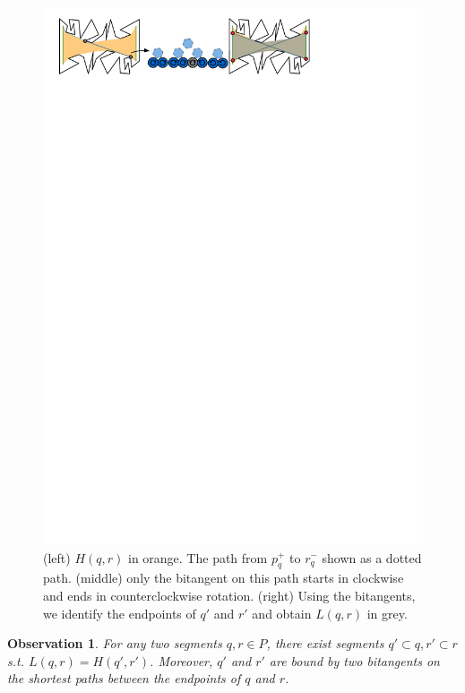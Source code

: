 \documentclass[UKenglish]{lipics-v2019}
\newcommand{\myremark}[4]{\textcolor{blue}{\textsc{#1 #2:}} \textcolor{#4}{\textsf{#3}}}
\newcommand{\ivor}[2][says]{\myremark{Ivor}{#1}{#2}{Blue}}
\renewcommand{\myremark}[4]{}
\newtheorem{observation}{Observation}
\begin{document}
  
 \begin{figure}[h]
    \centering
    \includegraphics[]{../visibilityglass}
    \caption{(left) $H(q,r)$ in orange. The path from $p_q^+$ to $r_q^-$ shown  as a dotted path. (middle) only the bitangent on this path starts in clockwise and ends in counterclockwise rotation. (right) Using the bitangents, we identify the endpoints of $q'$ and $r'$ and obtain $L(q,r)$ in grey. \ivor{make convex homepc}}
    \label{fig:visibilityglass}
\end{figure}

 

 
\begin{observation}
  \label{obs:obtain_L}
  For any two segments $q, r \in P$, there exist segments
  $q' \subset q, r' \subset r$ s.t. $L(q, r) = H(q', r')$. Moreover, $q'$ and
  $r'$ are bound by two bitangents on the shortest paths between the endpoints of $q$ and $r$.
\end{observation}
\end{document}
